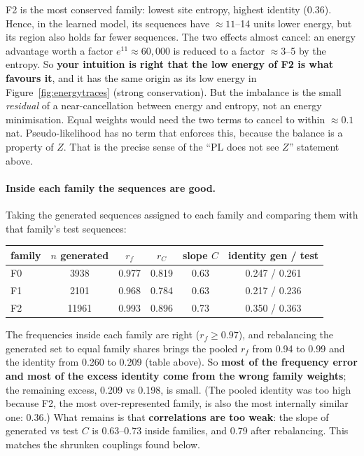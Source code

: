F2 is the most conserved family: lowest site entropy, highest identity (0.36). Hence, in the learned model,
its sequences have $\approx11$--14 units lower energy, but its region also holds far fewer sequences. The two
effects almost cancel: an energy advantage worth a factor $e^{11}\approx60{,}000$ is reduced to a factor
$\approx3$--5 by the entropy. So \textbf{your intuition is right that the low energy of F2 is what favours it},
and it has the same origin as its low energy in Figure~\ref{fig:energytraces} (strong conservation). But the imbalance is the
small \emph{residual} of a near-cancellation between energy and entropy, not an energy minimisation. Equal
weights would need the two terms to cancel to within $\approx0.1$ nat. Pseudo-likelihood has no term that
enforces this, because the balance is a property of $Z$. That is the precise sense of the ``PL does not see
$Z$'' statement above.

\paragraph{Inside each family the sequences are good.} Taking the generated sequences assigned to each
family and comparing them with that family's test sequences:
\begin{center}\small
\begin{tabular}{lccccc}
\toprule
family & $n$ generated & $r_f$ & $r_C$ & slope $C$ & identity gen / test\\
\midrule
F0 & 3938 & 0.977 & 0.819 & 0.63 & 0.247 / 0.261\\
F1 & 2101 & 0.968 & 0.784 & 0.63 & 0.217 / 0.236\\
F2 & 11961 & 0.993 & 0.896 & 0.73 & 0.350 / 0.363\\
\bottomrule
\end{tabular}
\end{center}
The frequencies inside each family are right ($r_f\ge0.97$), and rebalancing the generated set to equal
family shares brings the pooled $r_f$ from 0.94 to 0.99 and the identity from 0.260 to 0.209 (table
above). So \textbf{most of the frequency error and most of the excess identity come from the wrong family
weights}; the remaining excess, 0.209 vs 0.198, is small. (The pooled identity was too high because F2, the most over-represented family, is also the
most internally similar one: 0.36.) What remains is that \textbf{correlations are too weak}: the slope of
generated vs test $C$ is 0.63--0.73 inside families, and 0.79 after rebalancing. This matches the shrunken
couplings found below.

